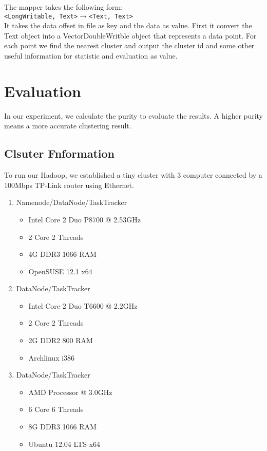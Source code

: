 \documentclass[a4paper,11pt]{article}
\begin{document}
The mapper takes the following form:\\
\verb|<LongWritable, Text>|$\rightarrow$\verb|<Text, Text>|\\
It takes the data offset in file as key and the data as value. First it convert
the Text object into a VectorDoubleWritble object that represents a data point.
For each point we find the nearest cluster and output the cluster id and some
other useful information for statistic and evaluation as value.


\section{Evaluation}\label{sec:evaluation}
In our experiment, we calculate the purity to evaluate the results. A higher purity means a more accurate clustering result.
\subsection{Clsuter Fnformation}
To run our Hadoop, we established a tiny cluster with 3 computer connected by a
100Mbps TP-Link router using Ethernet.
\begin{enumerate}
  \item Namenode/DataNode/TaskTracker
  \begin{itemize}
    \item Intel Core 2 Duo P8700 @ 2.53GHz
    \item 2 Core 2 Threads
    \item 4G DDR3 1066 RAM
    \item OpenSUSE 12.1 x64
  \end{itemize}
  \item DataNode/TaskTracker
  \begin{itemize}
    \item Intel Core 2 Duo T6600 @ 2.2GHz
    \item 2 Core 2 Threads
    \item 2G DDR2 800 RAM
    \item Archlinux i386
  \end{itemize}
  \item DataNode/TaskTracker
  \begin{itemize}
    \item AMD Processor @ 3.0GHz 
    \item 6 Core 6 Threads
    \item 8G DDR3 1066 RAM
    \item Ubuntu 12.04 LTS x64
  \end{itemize}
\end{enumerate}
\end{document}

